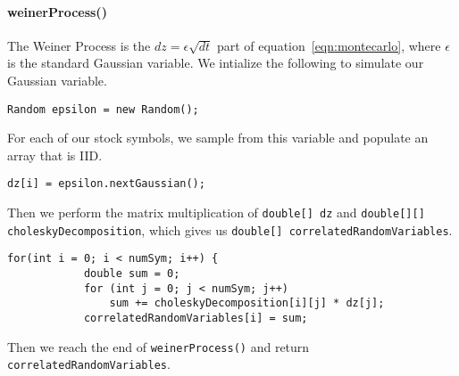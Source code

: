 \documentclass[../Dissertation.tex]{subfiles}
\begin{document}
\paragraph{weinerProcess()}

The Weiner Process is the $dz = \epsilon\sqrt{dt}$ part of equation~\ref{eqn:montecarlo}, where $\epsilon$ is the standard Gaussian variable.
We intialize the following to simulate our Gaussian variable.
\begin{lstlisting}[firstnumber = 9]
Random epsilon = new Random();
\end{lstlisting}
For each of our stock symbols, we sample from this variable and populate an array that is IID.
\begin{lstlisting}[firstnumber = 14]
	dz[i] = epsilon.nextGaussian();
\end{lstlisting}
Then we perform the matrix multiplication of \lstinline|double[] dz| and \lstinline|double[][] choleskyDecomposition|, which gives us \lstinline|double[] correlatedRandomVariables|.
\begin{lstlisting}[firstnumber = 17]
for(int i = 0; i < numSym; i++) {
            double sum = 0;
            for (int j = 0; j < numSym; j++)
                sum += choleskyDecomposition[i][j] * dz[j];
            correlatedRandomVariables[i] = sum;
\end{lstlisting}
Then we reach the end of \lstinline|weinerProcess()| and return \lstinline|correlatedRandomVariables|.
\end{document}
